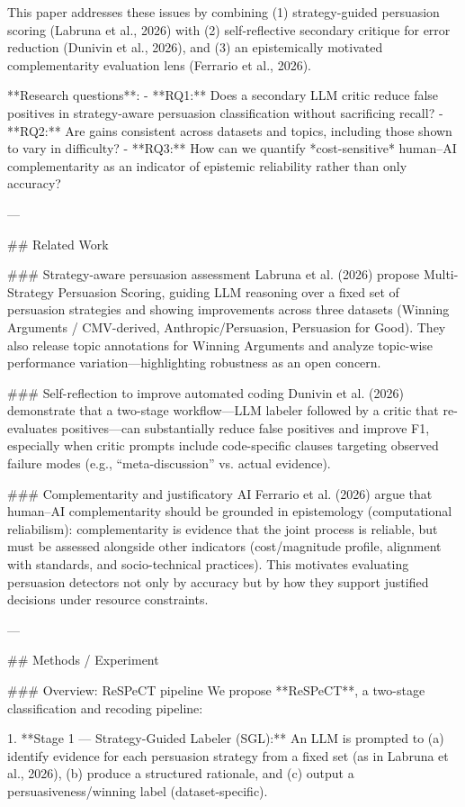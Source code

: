 This paper addresses these issues by combining (1) strategy-guided persuasion scoring (Labruna et al., 2026) with (2) self-reflective secondary critique for error reduction (Dunivin et al., 2026), and (3) an epistemically motivated complementarity evaluation lens (Ferrario et al., 2026).  

**Research questions**:  
- **RQ1:** Does a secondary LLM critic reduce false positives in strategy-aware persuasion classification without sacrificing recall?  
- **RQ2:** Are gains consistent across datasets and topics, including those shown to vary in difficulty?  
- **RQ3:** How can we quantify *cost-sensitive* human–AI complementarity as an indicator of epistemic reliability rather than only accuracy?

---

## Related Work  

### Strategy-aware persuasion assessment  
Labruna et al. (2026) propose Multi-Strategy Persuasion Scoring, guiding LLM reasoning over a fixed set of persuasion strategies and showing improvements across three datasets (Winning Arguments / CMV-derived, Anthropic/Persuasion, Persuasion for Good). They also release topic annotations for Winning Arguments and analyze topic-wise performance variation—highlighting robustness as an open concern.

### Self-reflection to improve automated coding  
Dunivin et al. (2026) demonstrate that a two-stage workflow—LLM labeler followed by a critic that re-evaluates positives—can substantially reduce false positives and improve F1, especially when critic prompts include code-specific clauses targeting observed failure modes (e.g., “meta-discussion” vs. actual evidence).

### Complementarity and justificatory AI  
Ferrario et al. (2026) argue that human–AI complementarity should be grounded in epistemology (computational reliabilism): complementarity is evidence that the joint process is reliable, but must be assessed alongside other indicators (cost/magnitude profile, alignment with standards, and socio-technical practices). This motivates evaluating persuasion detectors not only by accuracy but by how they support justified decisions under resource constraints.

---

## Methods / Experiment  

### Overview: ReSPeCT pipeline  
We propose **ReSPeCT**, a two-stage classification and recoding pipeline:

1. **Stage 1 — Strategy-Guided Labeler (SGL):**  
   An LLM is prompted to (a) identify evidence for each persuasion strategy from a fixed set (as in Labruna et al., 2026), (b) produce a structured rationale, and (c) output a persuasiveness/winning label (dataset-specific).


